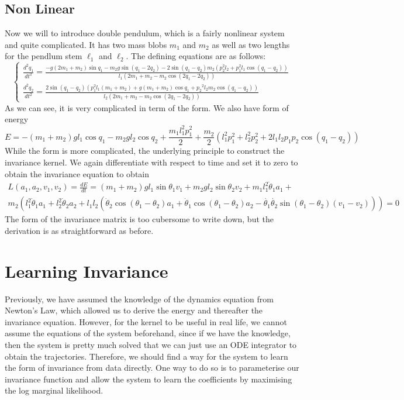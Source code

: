 \documentclass{statsmsc}
\begin{document}
\subsection{Non Linear}
Now we will to introduce double pendulum, which is a fairly nonlinear system and quite complicated. 
It has two mass blobs $m_1$ and $m_2$ as well as two lengths for the pendlum stem $\ell_1$ and $\ell_2$.
The defining equations are as follows:
$$
\begin{cases}
\frac{d^2q_1}{dt^2}=\frac{-g\left(2 m_{1}+m_{2}\right) \sin q_1-m_{2} g \sin \left(q_1-2 q_2\right)-2 \sin \left(q_1-q_2\right) m_{2}\left(p_2^{2} l_{2}+p_1^{2} l_{1} \cos \left(q_1-q_2\right)\right)}{l_{1}\left(2 m_{1}+m_{2}-m_{2} \cos \left(2 q_1-2 q_2\right)\right)} \\
\frac{d^2q_2}{dt^2}=\frac{2 \sin \left(q_1-q_2\right)\left(p_1^{2} l_{1}\left(m_{1}+m_{2}\right)+g\left(m_{1}+m_{2}\right) \cos q_1+p_2{ }^{2} l_{2} m_{2} \cos \left(q_1-q_2\right)\right)}{l_{2}\left(2 m_{1}+m_{2}-m_{2} \cos \left(2 q_1-2 q_2\right)\right)}
\end{cases}
$$
As we can see, it is very complicated in term of the form.
We also have form of energy 
$$
E = -(m_1+m_2)gl_1\cos q_1-m_2gl_2\cos q_2+ \frac{m_1l^2_1p_1^2}{2}+\frac{m_2}{2}(l^2_1p_1^2+l^2_2p_2^2+2l_1l_2p_1p_2\cos(q_1-q_2))
$$
While the form is more complicated, the underlying principle to construct the invariance kernel. 
We again differentiate with respect to time and set it to zero to obtain the invariance equation to obtain 
\begin{gather*}
L(a_1, a_2, v_1, v_2)=\frac{dE}{dt} = (m_1+m_2)gl_1\sin\theta_1v_1+m_2gl_2\sin\theta_2v_2+m_1l_1^2\dot{\theta}_1a_1+\\m_2(l_1^2\dot{\theta}_1a_1+l_2^2\dot{\theta}_2a_2+l_1l_2(\dot{\theta}_2\cos(\theta_1-\theta_2)a_1+\dot{\theta}_1\cos(\theta_1-\theta_2)a_2-\dot{\theta_1}\dot{\theta_2}\sin(\theta_1-\theta_2)(v_1-v_2)))=0
\end{gather*}
The form of the invariance matrix is too cubersome to write down, but the derivation is as straightforward as before. 



\section{Learning Invariance}
Previously, we have assumed the knowledge of the dynamics equation from Newton's Law, which allowed us to derive the energy and thereafter the invariance equation. 
However, for the kernel to be useful in real life, we cannot assume the equations of the system beforehand, since if we have the knowledge, then the system is pretty much solved that we can just use an ODE integrator to obtain the trajectories. 
Therefore, we should find a way for the system to learn the form of invariance from data directly.
One way to do so is to parameterise our invariance function and allow the system to learn the coefficients by maximising the log marginal likelihood.
\end{document}
